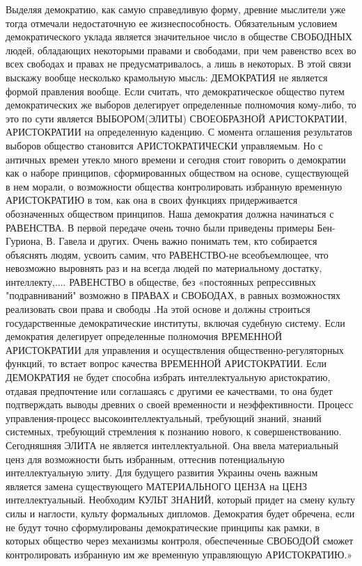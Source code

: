 Выделяя демократию, как самую справедливую форму,
древние мыслители уже тогда отмечали недостаточную ее
жизнеспособность. Обязательным условием демократического уклада является
значительное число в обществе СВОБОДНЫХ людей, обладающих некоторыми правами и
свободами, при чем равенство всех во всех свободах и правах не
предусматривалось, а лишь в некоторых. В этой связи выскажу вообще несколько
крамольную мысль: ДЕМОКРАТИЯ не является формой правления вообще. Если
считать, что демократическое общество путем демократических же выборов
делегирует определенные полномочия кому-либо, то это по сути является
ВЫБОРОМ(ЭЛИТЫ) СВОЕОБРАЗНОЙ АРИСТОКРАТИИ, АРИСТОКРАТИИ на определенную
каденцию. С момента оглашения результатов выборов общество становится
АРИСТОКРАТИЧЕСКИ управляемым. Но с античных времен утекло много времени и
сегодня стоит говорить о демократии как о наборе принципов, сформированных
обществом на основе, существующей в нем морали, о возможности общества
контролировать избранную временную АРИСТОКРАТИЮ в том, как она в своих
функциях придерживается обозначенных обществом принципов. Наша демократия
должна начинаться с РАВЕНСТВА. В первой передаче очень точно были приведены
примеры Бен-Гуриона, В. Гавела и других. Очень важно понимать тем, кто собирается
объяснять людям, усвоить самим, что РАВЕНСТВО-не всеобъемлющее, что невозможно
выровнять раз и на всегда людей по материальному
достатку, интеллекту,.... РАВЕНСТВО в обществе, без «постоянных репрессивных
"подравниваний" возможно в ПРАВАХ и СВОБОДАХ, в равных возможностях
реализовать свои права и свободы .На этой основе и должны строиться
государственные демократические институты, включая судебную систему. Если
демократия делегирует определенные полномочия ВРЕМЕННОЙ АРИСТОКРАТИИ для
управления и осуществления общественно-регуляторных функций, то встает вопрос
качества ВРЕМЕННОЙ АРИСТОКРАТИИ. Если ДЕМОКРАТИЯ не будет способна избрать
интеллектуальную аристократию, отдавая предпочтение или соглашаясь с другими
ее качествами, то она будет подтверждать выводы древних о своей временности и
неэффективности. Процесс управления-процесс высокоинтеллектуальный, требующий
знаний, знаний системных, требующий стремления к познанию нового, к
совершенствованию. Сегодняшняя ЭЛИТА не является интеллектуальной. Она ввела
материальный ценз для возможности быть избранным, оттеснив потенциальную
интеллектуальную элиту. Для будущего развития Украины очень важным является
замена существующего МАТЕРИАЛЬНОГО ЦЕНЗА на ЦЕНЗ интеллектуальный. Необходим
КУЛЬТ ЗНАНИЙ, который придет на смену культу силы и наглости, культу формальных
дипломов. Демократия будет обречена, если не будут точно сформулированы
демократические принципы как рамки, в которых общество через механизмы
контроля, обеспеченные СВОБОДОЙ сможет контролировать избранную им же
временную управляющую АРИСТОКРАТИЮ.»

